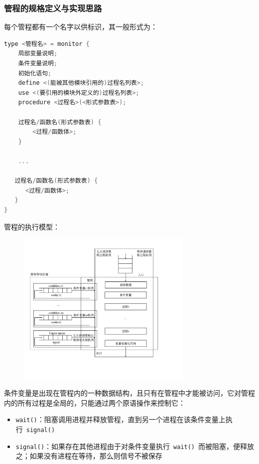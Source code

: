\documentclass[cs4size,a4paper,10pt]{ctexart}
\begin{document}
	\subsubsection{管程的规格定义与实现思路}
	每个管程都有一个名字以供标识，其一般形式为：
	\begin{lstlisting}[language=C, keywordstyle=\color{black}]
type <管程名> = monitor {
	局部变量说明;
	条件变量说明;
	初始化语句;
	define <(能被其他模块引用的)过程名列表>;
	use <(要引用的模块外定义的)过程名列表>;
	procedure <过程名>(<形式参数表>);

	过程名/函数名(形式参数表) {
		<过程/函数体>;
	}
	
	...
   
   过程名/函数名(形式参数表) {
      <过程/函数体>;
   }
}
	\end{lstlisting}

	管程的执行模型：
	\begin{figure}[H]
		\centering
		\includegraphics[width=0.75\textwidth]{img/管程的执行模型.pdf}
	\end{figure}
	条件变量是出现在管程内的一种数据结构，且只有在管程中才能被访问，它对管程内的所有过程是全局的，只能通过两个原语操作来控制它：
	\begin{itemize}
		\item \verb|wait()|：阻塞调用进程并释放管程，直到另一个进程在该条件变量上执行\ \verb|signal()|
		\item \verb|signal()|：如果存在其他进程由于对条件变量执行\ \verb|wait()|\ 而被阻塞，便释放之；如果没有进程在等待，那么则信号不被保存
	\end{itemize}
\end{document}

